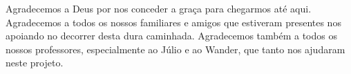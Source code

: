 \begin{agradecimentos}
\setlength{\parindent}{0pt}
Agradecemos a Deus por nos conceder a graça para chegarmos até aqui. Agradecemos a todos os nossos familiares e amigos que estiveram presentes nos apoiando no decorrer desta dura caminhada. Agradecemos também a todos os nossos professores, especialmente ao Júlio e ao Wander, que tanto nos ajudaram neste projeto.
\end{agradecimentos} 